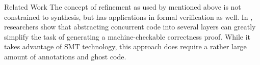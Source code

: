 \begin{paragraph}{Related Work}
The concept of refinement as used by \cite{TPHOLs1996/Butler,POPL2015/Delaware} mentioned above
is not constrained to synthesis, but has applications in formal verification
as well. In \cite{CAV2015/Hawblitzel}, researchers show that abstracting
concurrent code into several layers can greatly simplify the task of generating
a machine-checkable correctness proof.
While it takes advantage of SMT technology, this approach does require a rather
large amount of annotations and ghost code.
\end{paragraph}
